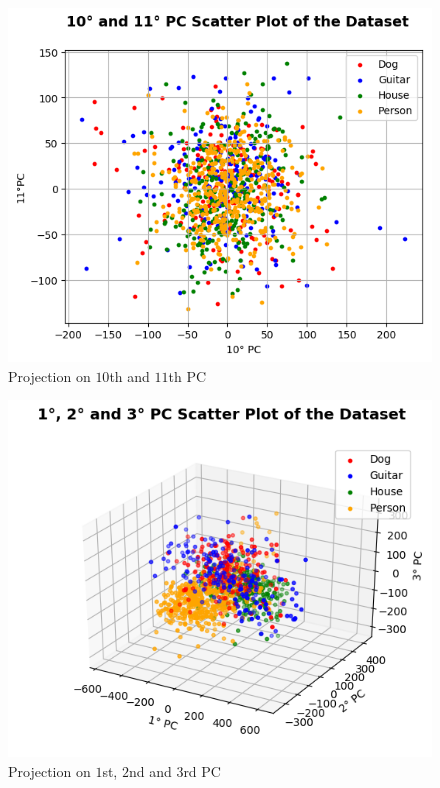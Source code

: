 \documentclass[a4paper, 11pt]{article}
\begin{document}
	\begin{figure}[ht!]
		\centering
		\includegraphics[height=0.5\paperwidth]{img/fig02c.png}
		\caption{Projection on $10$th and $11$th PC}
		\label{fig:scatter3}
	\end{figure}
	\begin{figure}[ht!]
		\centering
		\includegraphics[height=0.5\paperwidth]{img/fig02d.png}
		\caption{Projection on $1$st, $2$nd and $3$rd PC}
		\label{fig:scatter4}
	\end{figure}
\end{document}

